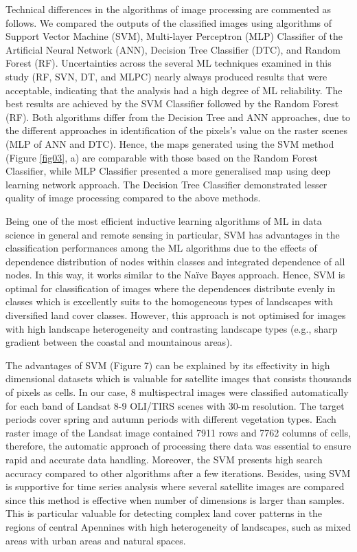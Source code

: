 \documentclass[jimaging,article,submit,pdftex,moreauthors]{Definitions/mdpi}
\begin{document}
Technical differences in the algorithms of image processing are commented as follows. We compared the outputs of the classified images using algorithms of Support Vector Machine (SVM), Multi-layer Perceptron (MLP) Classifier of the Artificial Neural Network (ANN), Decision Tree Classifier (DTC), and Random Forest (RF). Uncertainties across the several ML techniques examined in this study (RF, SVN, DT, and MLPC) nearly always produced results that were acceptable, indicating that the analysis had a high degree of ML reliability. The best results are achieved by the SVM Classifier followed by the Random Forest (RF). Both algorithms differ from the Decision Tree and ANN approaches, due to the different approaches in  identification of the pixels's value on the raster scenes (MLP of ANN and DTC). Hence, the maps generated using the SVM method (Figure \ref{fig03}, a) are comparable with those based on the Random Forest Classifier, while MLP Classifier presented a more generalised map using deep learning network approach. The Decision Tree Classifier demonstrated lesser quality of image processing compared to the above methods. 

Being one of the most efficient inductive learning algorithms of ML in data science in general and remote sensing in particular, SVM has advantages in the classification performances among the ML algorithms due to the effects of dependence distribution of nodes within classes and integrated dependence of all nodes. In this way, it works similar to the Naïve Bayes approach. Hence, SVM is optimal for classification of images where the dependences distribute evenly in classes which is excellently suits to the homogeneous types of landscapes with diversified land cover classes. However, this approach is not optimised for images with high landscape heterogeneity and contrasting landscape types (e.g., sharp gradient between the coastal and mountainous areas).

The advantages of SVM (Figure 7) can be explained by its effectivity in high dimensional datasets which is valuable for satellite images that consists thousands of pixels as cells. In our case, 8 multispectral images were classified automatically for each band of Landsat 8-9 OLI/TIRS scenes with 30-m resolution. The target periods cover spring and autumn periods with different vegetation types. Each raster image of the Landsat image contained 7911 rows and 7762 columns of cells, therefore, the automatic approach of processing there data was essential to ensure rapid and accurate data handling. Moreover, the SVM presents high search accuracy compared to other algorithms after a few iterations. Besides, using SVM is supportive for time series analysis where several satellite images are compared since this method is effective when number of dimensions is larger than samples. This is particular valuable for detecting complex land cover patterns in the regions of central Apennines with high heterogeneity of landscapes, such as mixed areas with urban areas and natural spaces. 
\end{document}
